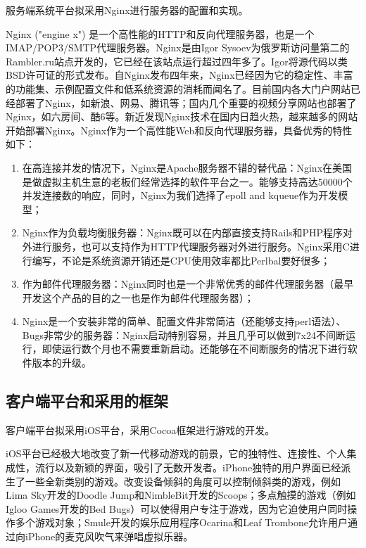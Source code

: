 \documentclass{article}
\begin{document}
\begin{CJK}{UTF8}{gbsn}
  服务端系统平台拟采用Nginx进行服务器的配置和实现。

  Nginx ("engine x") 是一个高性能的HTTP和反向代理服务器，也是一个IMAP/POP3/SMTP代理服务器。Nginx是由Igor Sysoev为俄罗斯访问量第二的Rambler.ru站点开发的，它已经在该站点运行超过四年多了。Igor将源代码以类BSD许可证的形式发布。自Nginx发布四年来，Nginx已经因为它的稳定性、丰富的功能集、示例配置文件和低系统资源的消耗而闻名了。目前国内各大门户网站已经部署了Nginx，如新浪、网易、腾讯等；国内几个重要的视频分享网站也部署了Nginx，如六房间、酷6等。新近发现Nginx技术在国内日趋火热，越来越多的网站开始部署Nginx。Nginx作为一个高性能Web和反向代理服务器，具备优秀的特性如下\cite{WIKI_Nginx}：

  \begin{enumerate}
    \item 在高连接并发的情况下，Nginx是Apache服务器不错的替代品：Nginx在美国是做虚拟主机生意的老板们经常选择的软件平台之一。能够支持高达50000个并发连接数的响应，同时，Nginx为我们选择了epoll and kqueue作为开发模型；
    \item Nginx作为负载均衡服务器：Nginx既可以在内部直接支持Rails和PHP程序对外进行服务，也可以支持作为HTTP代理服务器对外进行服务。Nginx采用C进行编写，不论是系统资源开销还是CPU使用效率都比Perlbal要好很多；
    \item 作为邮件代理服务器：Nginx同时也是一个非常优秀的邮件代理服务器（最早开发这个产品的目的之一也是作为邮件代理服务器）；
    \item Nginx是一个安装非常的简单、配置文件非常简洁（还能够支持perl语法）、Bugs非常少的服务器：Nginx启动特别容易，并且几乎可以做到7x24不间断运行，即使运行数个月也不需要重新启动。还能够在不间断服务的情况下进行软件版本的升级。
  \end{enumerate}

  \subsection{客户端平台和采用的框架}

  客户端平台拟采用iOS平台，采用Cocoa框架进行游戏的开发。

  iOS平台已经极大地改变了新一代移动游戏的前景，它的独特性、连接性、个人集成性，流行以及新颖的界面，吸引了无数开发者。iPhone独特的用户界面已经派生了一些全新类别的游戏。改变设备倾斜的角度可以控制倾斜类的游戏，例如Lima Sky开发的Doodle Jump和NimbleBit开发的Scoops；多点触摸的游戏（例如Igloo Games开发的Bed Bugs）可以使得用户专注于游戏，因为它迫使用户同时操作多个游戏对象；Smule开发的娱乐应用程序Ocarina和Leaf Trombone允许用户通过向iPhone的麦克风吹气来弹唱虚拟乐器\cite{B02}。


\end{CJK}
\end{document}

